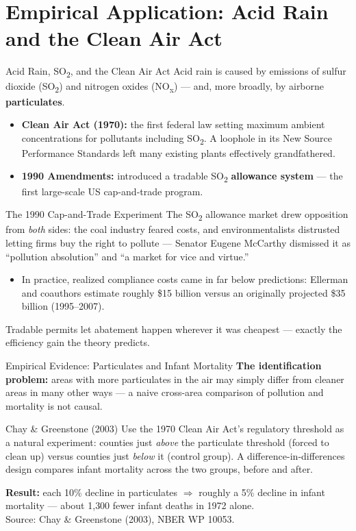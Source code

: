 \documentclass[11pt,aspectratio=169]{beamer}
\newcommand{\srcnote}[1]{{\footnotesize\color{wugray}Source: #1}}
\begin{document}
\section{Empirical Application: Acid Rain and the Clean Air Act}

\begin{frame}{Acid Rain, SO\textsubscript{2}, and the Clean Air Act}
  Acid rain is caused by emissions of sulfur dioxide (SO\textsubscript{2}) and nitrogen oxides (NO\textsubscript{x}) --- and, more broadly, by airborne \textbf{particulates}.
  \begin{itemize}
    \item \textbf{Clean Air Act (1970):} the first federal law setting maximum ambient concentrations for pollutants including SO\textsubscript{2}. A loophole in its New Source Performance Standards left many existing plants effectively grandfathered.
    \item \textbf{1990 Amendments:} introduced a tradable SO\textsubscript{2} \textbf{allowance system} --- the first large-scale US cap-and-trade program.
  \end{itemize}
\end{frame}

\begin{frame}{The 1990 Cap-and-Trade Experiment}
  The SO\textsubscript{2} allowance market drew opposition from \emph{both} sides: the coal industry feared costs, and environmentalists distrusted letting firms buy the right to pollute --- Senator Eugene McCarthy dismissed it as ``pollution absolution'' and ``a market for vice and virtue.''
  \begin{itemize}
    \item In practice, realized compliance costs came in far below predictions: Ellerman and coauthors estimate roughly \$15 billion versus an originally projected \$35 billion (1995--2007).
  \end{itemize}
  \small Tradable permits let abatement happen wherever it was cheapest --- exactly the efficiency gain the theory predicts.
\end{frame}

\begin{frame}{Empirical Evidence: Particulates and Infant Mortality}
  \textbf{The identification problem:} areas with more particulates in the air may simply differ from cleaner areas in many other ways --- a naive cross-area comparison of pollution and mortality is not causal.
  \begin{block}{Chay \& Greenstone (2003)}
    Use the 1970 Clean Air Act's regulatory threshold as a natural experiment: counties just \emph{above} the particulate threshold (forced to clean up) versus counties just \emph{below} it (control group). A difference-in-differences design compares infant mortality across the two groups, before and after.
  \end{block}
  \textbf{Result:} each 10\% decline in particulates $\Rightarrow$ roughly a 5\% decline in infant mortality --- about 1{,}300 fewer infant deaths in 1972 alone.\\
  \srcnote{Chay \& Greenstone (2003), NBER WP 10053.}
\end{frame}
\end{document}
